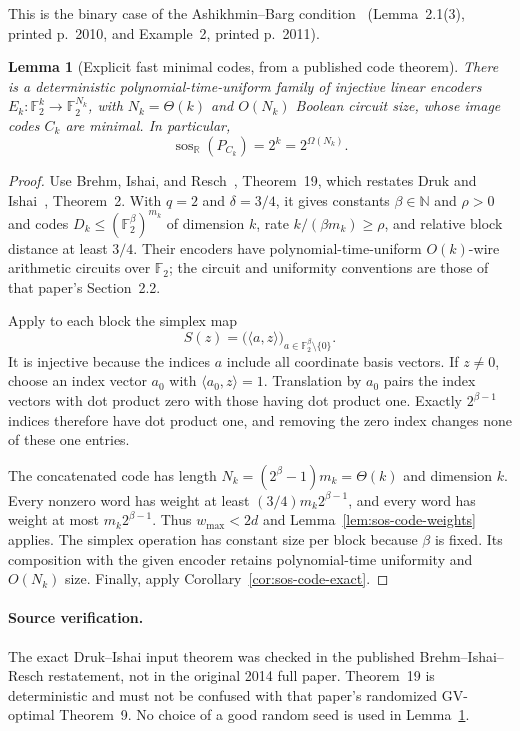 \documentclass[11pt]{article}
\newtheorem{lemma}[theorem]{Lemma}
\theoremstyle{definition}
\theoremstyle{remark}
\begin{document}
This is the binary case of the Ashikhmin--Barg
condition~\cite{ab} (Lemma~2.1(3), printed p.~2010, and Example~2,
printed p.~2011).

\begin{lemma}[Explicit fast minimal codes, from a published code theorem]
\label{lem:sos-fast-minimal}
There is a deterministic polynomial-time-uniform family of injective
linear encoders $E_k:\mathbb F_2^k\to\mathbb F_2^{N_k}$, with
$N_k=\Theta(k)$ and $O(N_k)$ Boolean circuit size, whose image codes
$C_k$ are minimal.  In particular,
\[
 \operatorname{sos}_{\mathbb R}(P_{C_k})=2^k=2^{\Omega(N_k)}.
\]
\end{lemma}
\begin{proof}
Use Brehm, Ishai, and Resch~\cite{bir}, Theorem~19, which restates
Druk and Ishai~\cite{di14}, Theorem~2.
With $q=2$ and $\delta=3/4$, it gives constants $\beta\in\mathbb N$
and $\rho>0$ and codes
$D_k\le(\mathbb F_2^\beta)^{m_k}$ of dimension $k$, rate
$k/(\beta m_k)\ge\rho$, and relative block distance at least $3/4$.
Their encoders have polynomial-time-uniform $O(k)$-wire arithmetic
circuits over $\mathbb F_2$; the circuit and uniformity conventions
are those of that paper's Section~2.2.

Apply to each block the simplex map
\[
 S(z)=\bigl(\langle a,z\rangle\bigr)_{a\in\mathbb F_2^\beta\setminus\{0\}}.
\]
It is injective because the indices $a$ include all coordinate basis
vectors.  If $z\ne0$, choose an index vector $a_0$ with
$\langle a_0,z\rangle=1$.
Translation by $a_0$ pairs the index vectors with dot product zero
with those having dot product one.  Exactly $2^{\beta-1}$ indices
therefore have dot product one, and removing the zero index changes
none of these one entries.

The concatenated code has length $N_k=(2^\beta-1)m_k=\Theta(k)$
and dimension $k$.  Every nonzero word has weight at least
$(3/4)m_k2^{\beta-1}$, and every word has weight at most
$m_k2^{\beta-1}$.  Thus $w_{\max}<2d$ and
Lemma~\ref{lem:sos-code-weights} applies.
The simplex operation has constant size per block because $\beta$
is fixed.  Its composition with the given encoder retains
polynomial-time uniformity and $O(N_k)$ size.
Finally, apply Corollary~\ref{cor:sos-code-exact}.
\end{proof}

\paragraph{Source verification.}
The exact Druk--Ishai input theorem was checked in the published
Brehm--Ishai--Resch restatement, not in the original 2014 full paper.
Theorem~19 is deterministic and must not be confused with that paper's
randomized GV-optimal Theorem~9.  No choice of a good random seed is
used in Lemma~\ref{lem:sos-fast-minimal}.
\end{document}
